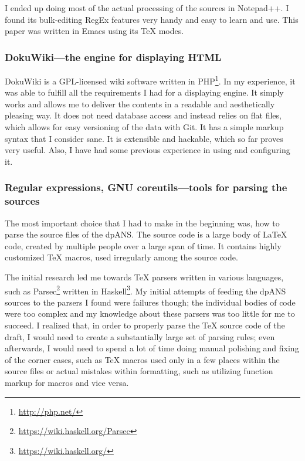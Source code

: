 I ended up doing most of the actual processing of the sources in Notepad++. I found its bulk-editing RegEx features very handy and easy to learn and use. This paper was written in Emacs using its TeX modes.

\subsubsection{DokuWiki---the engine for displaying HTML}

DokuWiki is a GPL-licensed wiki software written in PHP\footnote{\url{http://php.net/}}. In my experience, it was able to fulfill all the requirements I had for a displaying engine. It simply works and allows me to deliver the contents in a readable and aesthetically pleasing way. It does not need database access and instead relies on flat files, which allows for easy versioning of the data with Git. It has a simple markup syntax that I consider sane. It is extensible and hackable, which so far proves very useful. Also, I have had some previous experience in using and configuring it.

\subsubsection{Regular expressions, GNU coreutils---tools for parsing the sources}

The most important choice that I had to make in the beginning was, how to parse the source files of the dpANS. The source code is a large body of \LaTeX{} code, created by multiple people over a large span of time. It contains highly customized \TeX{} macros, used irregularly among the source code.

The initial research led me towards \TeX{} parsers written in various languages, such as Parsec\footnote{\url{https://wiki.haskell.org/Parsec}} written in Haskell\footnote{\url{https://wiki.haskell.org/}}. My initial attempts of feeding the dpANS sources to the parsers I found were failures though; the individual bodies of code were too complex and my knowledge about these parsers was too little for me to succeed. I realized that, in order to properly parse the \TeX{} source code of the draft, I would need to create a substantially large set of parsing rules; even afterwards, I would need to spend a lot of time doing manual polishing and fixing of the corner cases, such as \TeX{} macros used only in a few places within the source files or actual mistakes within formatting, such as utilizing function markup for macros and vice versa.

